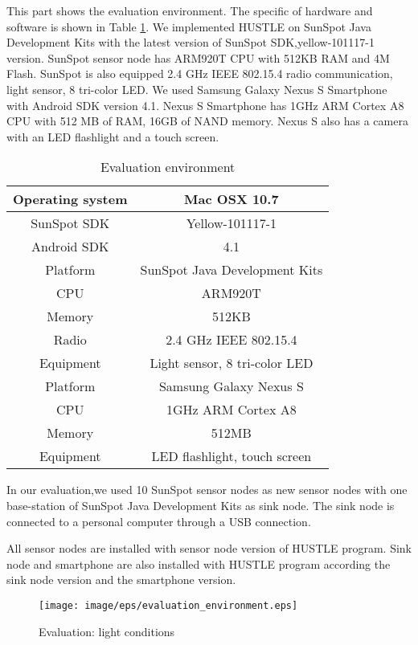 This part shows the evaluation environment. The specific of hardware and software is shown in Table \ref{tab:evaluation_environment}. We implemented HUSTLE on SunSpot Java Development Kits with the latest version of SunSpot SDK,yellow-101117-1 version. SunSpot sensor node has ARM920T CPU with 512KB RAM and 4M Flash. SunSpot is also equipped 2.4 GHz IEEE 802.15.4 radio communication, light sensor, 8 tri-color LED. We used Samsung Galaxy Nexus S Smartphone with Android SDK version 4.1. Nexus S Smartphone has 1GHz ARM Cortex A8 CPU with 512 MB of RAM, 16GB of NAND memory. Nexus S also has a camera with an LED flashlight and a touch screen.

\begin{table}[h]
\caption{Evaluation environment}
\begin{center}
\begin{tabular}{|c|c|}
\hline
Operating system& Mac OSX 10.7\\
\hline
SunSpot SDK&Yellow-101117-1\\
\hline
Android SDK&4.1\\
\hline
\hline
Platform&SunSpot Java Development Kits\\
\hline
CPU&ARM920T\\
\hline
Memory&512KB\\
\hline
Radio&2.4 GHz IEEE 802.15.4\\
\hline
Equipment& Light sensor, 8 tri-color LED\\
\hline
\hline
Platform&Samsung Galaxy Nexus S\\
\hline
CPU&1GHz ARM Cortex A8\\
\hline
Memory&512MB\\
\hline
Equipment& LED flashlight, touch screen\\
\hline
\end{tabular}
\end{center}
\label{tab:evaluation_environment}
\end{table}%

In our evaluation,we used 10 SunSpot sensor nodes as new sensor nodes with one base-station of SunSpot Java Development Kits as sink node. The sink node is connected to a personal computer through a USB connection.

All sensor nodes are installed with sensor node version of HUSTLE program. Sink node and smartphone are also installed with HUSTLE program according the sink node version and the smartphone version.

\begin{figure}[htbp]
\centering
\texttt{[image: image/eps/evaluation\_environment.eps]}
\caption{Evaluation: light conditions}
\label{fig:evaluation_environment}
\end{figure}


